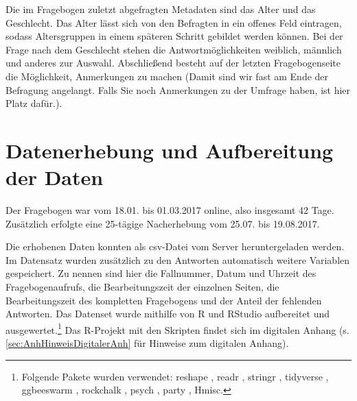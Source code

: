 Die im Fragebogen zuletzt abgefragten Metadaten sind das Alter und das Geschlecht. Das Alter lässt sich von den Befragten in ein offenes Feld eintragen, sodass Altersgruppen in einem späteren Schritt gebildet werden können. Bei der Frage nach dem Geschlecht stehen die Antwortmöglichkeiten \glqq weiblich\grqq, \glqq männlich\grqq{} und \glqq anderes\grqq{} zur Auswahl. Abschließend besteht auf der letzten Fragebogenseite die Möglichkeit, Anmerkungen zu machen (\glqq Damit sind wir fast am Ende der Befragung angelangt. Falls Sie noch Anmerkungen zu der Umfrage haben, ist hier Platz dafür.\grqq). 

\section{Datenerhebung und Aufbereitung der Daten}
\label{sec:DatenerhebungundAufbereitung}
Der Fragebogen war vom 18.01. bis 01.03.2017 online, also insgesamt 42 Tage. Zusätzlich erfolgte eine 25-tägige Nacherhebung vom 25.07. bis 19.08.2017. 

Die erhobenen Daten konnten als csv-Datei vom Server heruntergeladen werden. Im Datensatz wurden zusätzlich zu den Antworten automatisch weitere Variablen gespeichert. Zu nennen sind hier die Fallnummer, Datum und Uhrzeit des Fragebogenaufrufs, die Bearbeitungszeit der einzelnen Seiten, die Bearbeitungszeit des kompletten Fragebogens und der Anteil der fehlenden Antworten. Das Datenset wurde mithilfe von R \citep[][Version 3.6.1]{RCoreTeam2019} und RStudio \citep[][Version 1.2.5033]{RStudio.2019} aufbereitet und ausgewertet.\footnote{Folgende Pakete wurden verwendet: 
reshape \citep[][Version 0.8.8]{Wickham.2018}, 
readr \citep[][Version 1.3.1]{Wickham.2018b},
stringr \citep[][Version 1.4.0]{Wickham.2019}, 
tidyverse \citep[][Version 1.3.0]{Wickham.2019b},
ggbeeswarm \citep[][Version 0.6.0]{Clarke.2017}, 
rockchalk \citep[][Version 1.8.144]{Johnson.2019},
psych \citep[][Version 2.0.7]{Revelle2016},
party \citep[][Version 1.3-4]{Hothorn.2010},
Hmisc\citep[][Version 4.4-0]{Harrell.2020}.} 
Das R-Projekt mit den Skripten findet sich im digitalen Anhang (s. \autoref{sec:AnhHinweisDigitalerAnh} für Hinweise zum digitalen Anhang). 
